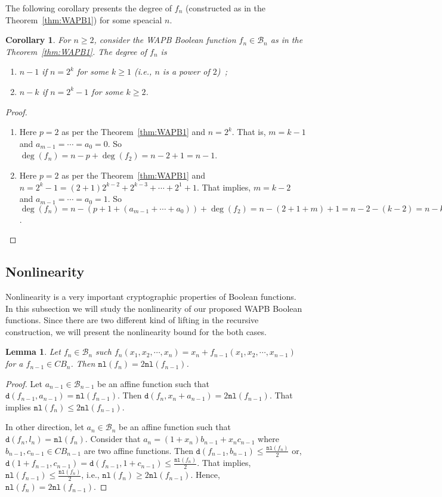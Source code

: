 \documentclass{article}[12pt]
\newtheorem{corollary}[theorem]{Corollary}
\newtheorem{lemma}[theorem]{Lemma}
\newcommand{\CB}{\mathcal{B}}
\newcommand{\nl}{\mathtt{nl}}
\newcommand{\ds}{\mathtt{d}}
\begin{document}
The following corollary presents the degree of $f_n$ (constructed as in the Theorem~\ref{thm:WAPB1}) for some speacial $n$.
\begin{corollary}
For $n \geq 2$, consider the WAPB Boolean function $f_n \in \CB_n$ as in the Theorem~\ref{thm:WAPB1}. The degree of $f_n$ is
\begin{enumerate}
\item $n-1$ if $n = 2^k$ for some $k \geq 1$ (i.e.,  $n$ is a power of $2$)~\cite[Corollary 3]{MS21};
\item $n-k$ if $n = 2^k-1$ for some $k \geq 2$.
\end{enumerate}
\end{corollary}
\begin{proof}
 \begin{enumerate}
\item Here $p = 2$ as per the Theorem~\ref{thm:WAPB1} and $n = 2^k$. That is, $m = k-1$ and $a_{m-1}= \cdots = a_0 = 0$.
So $\deg(f_n) = n - p+\deg(f_2) = n - 2 + 1 = n-1$.
\item Here $p = 2$ as per the Theorem~\ref{thm:WAPB1} and $n = 2^k-1 = (2+1)2^{k-2}+2^{k-3}+ \cdots+ 2^1 + 1$. That implies,
$m = k-2$ and $a_{m-1} = \cdots = a_0 = 1$. So $\deg(f_n) = n - (p+1+(a_{m-1} + \cdots + a_0))+\deg(f_2) = n - (2 + 1 + m)+1= n-2-(k-2) = n-k$.
 \end{enumerate}

\end{proof}

\subsection{Nonlinearity}\label{ssec:nl}
Nonlinearity is a very important cryptographic properties of Boolean functions. In this subsection we will study the nonlinearity of our proposed WAPB Boolean functions. Since there are two different kind of lifting in the recursive construction, we will present the nonlinearity bound for the both cases.
\begin{lemma}\label{lem:nl1}
Let $f_n \in \CB_n$ such $f_n(x_1, x_2, \cdots,x_n) = x_n + f_{n-1}(x_1, x_2, \cdots,x_{n-1})$ for a $f_{n-1} \in CB_n$.
Then $\nl(f_n) = 2\nl(f_{n-1})$.
\end{lemma}
\begin{proof}
Let $a_{n-1} \in \CB_{n-1}$ be an affine function such that $\ds(f_{n-1},a_{n-1}) = \nl(f_{n-1})$. Then $\ds(f_n,x_n+a_{n-1}) = 2\nl(f_{n-1})$. That implies $\nl(f_n) \leq 2\nl(f_{n-1})$.

In other direction, let $a_n \in \CB_n$ be an affine function such that $\ds(f_n,l_n) = \nl(f_n)$. Consider that $a_n = (1+x_n)b_{n-1} + x_n c_{n-1}$ where $b_{n-1}, c_{n-1} \in CB_{n-1}$ are two affine functions. Then $\ds(f_{n-1},b_{n-1}) \leq \frac{\nl(f_n)}{2}$ or, $\ds(1+f_{n-1},c_{n-1}) = \ds(f_{n-1},1+c_{n-1}) \leq \frac{\nl(f_n)}{2}$. That implies,
$\nl(f_{n-1}) \leq \frac{\nl(f_n)}{2}$, i.e., $\nl(f_n) \geq 2\nl(f_{n-1})$. Hence, $\nl(f_n) = 2\nl(f_{n-1})$.
\end{proof}
\end{document}
